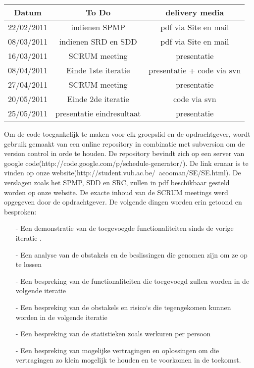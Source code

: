 \documentclass{article}
\begin{document}
\begin{center}
\begin{tabular}[t]{|c|c|c|}
\hline
Datum	& To Do & delivery media  \\
\hline
\hline
22/02/2011 &	indienen SPMP & pdf via Site en mail\\
\hline
08/03/2011 &	indienen SRD en SDD & pdf via Site en mail\\
\hline
16/03/2011 &	SCRUM meeting & presentatie\\
\hline
08/04/2011 &	Einde 1ste iteratie & presentatie + code via svn \\
\hline
27/04/2011 &	SCRUM meeting & presentatie \\
\hline
20/05/2011 &	Einde 2de iteratie & code via svn\\
\hline
25/05/2011 &	presentatie eindresultaat & presentatie\\
\hline
\end{tabular}
\end{center}

Om de code toegankelijk te maken voor elk groepslid en de opdrachtgever, wordt gebruik gemaakt van een online repository in combinatie met subversion om de version control in orde te houden. De repository bevindt zich op een server van google code(http://code.google.com/p/schedule-generator/). De link ernaar is te vinden op onze website(http://student.vub.ac.be/~acooman/SE/SE.html).
De verslagen zoals het SPMP, SDD en SRC, zullen in pdf beschikbaar gesteld worden op onze website.
De exacte inhoud van de SCRUM meetings werd opgegeven door de opdrachtgever. De volgende dingen worden erin getoond en besproken: \\[-5mm]
\begin{itemize}
 \item[-] Een demonstratie van de toegevoegde functionaliteiten sinds de vorige iteratie .\\[-5mm]
 \item[-] Een analyse van de obstakels en de beslissingen die genomen zijn om ze op te lossen\\[-5mm]
 \item[-] Een bespreking van de functionaliteiten die toegevoegd zullen worden in de volgende iteratie\\[-5mm]
 \item[-] Een bespreking van de obstakels en risico`s die tegengekomen kunnen worden in de volgende iteratie \\[-5mm]
 \item[-] Een bespreking van de statistieken zoals werkuren per persoon \\[-5mm]
 \item[-] Een bespreking van mogelijke vertragingen en oplossingen om die vertragingen zo klein mogelijk te houden en te voorkomen in de toekomst.\\[-5mm]
\end{itemize}
\end{document}
